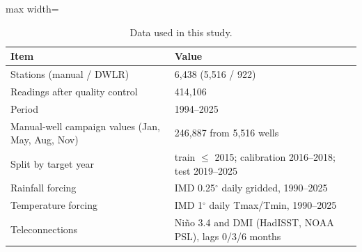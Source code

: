 \begin{table}[t]
\caption{Data used in this study.}
\label{tab:data}
\centering\small
\begin{adjustbox}{max width=\textwidth}
\begin{tabular}{ll}
\toprule
Item & Value \\
\midrule
Stations (manual / DWLR) & 6,438 (5,516 / 922) \\
Readings after quality control & 414,106 \\
Period & 1994--2025 \\
Manual-well campaign values (Jan, May, Aug, Nov) & 246,887 from 5,516 wells \\
Split by target year & train $\le$ 2015; calibration 2016--2018; test 2019--2025 \\
Rainfall forcing & IMD 0.25$^\circ$ daily gridded, 1990--2025 \\
Temperature forcing & IMD 1$^\circ$ daily Tmax/Tmin, 1990--2025 \\
Teleconnections & Ni\~no 3.4 and DMI (HadISST, NOAA PSL), lags 0/3/6 months \\
\bottomrule
\end{tabular}
\end{adjustbox}
\end{table}
